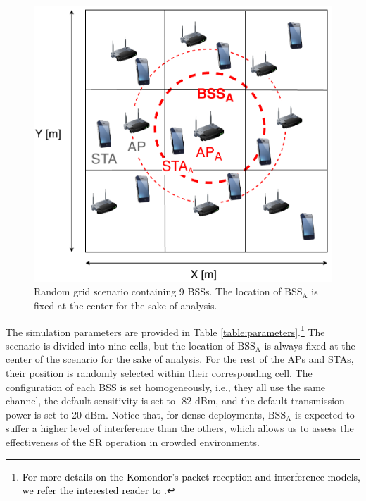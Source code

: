 \documentclass[preprint,12pt]{elsarticle}
\begin{document}
\begin{figure}[ht!]
	\centering
	\includegraphics[width=0.45\columnwidth]{random_scenario}
	\caption{Random grid scenario containing 9 BSSs. The location of $\text{BSS}_\text{A}$ is fixed at the center for the sake of analysis.}
	\label{fig:random_scenario}
\end{figure}

The simulation parameters are provided in Table \ref{table:parameters}.\footnote{\textcolor{black}{For more details on the Komondor's packet reception and interference models, we refer the interested reader to \cite{barrachina2019komondor}.}} The scenario is divided into nine cells, but the location of $\text{BSS}_\text{A}$ is always fixed at the center of the scenario for the sake of analysis. For the rest of the APs and STAs, their position is randomly selected within their corresponding cell. The configuration of each BSS is set homogeneously, i.e., they all use the same channel, the default sensitivity is set to -82 dBm, and the default transmission power is set to 20 dBm. Notice that, for dense deployments, $\text{BSS}_\text{A}$ is expected to suffer a higher level of interference than the others, which allows us to assess the effectiveness of the SR operation in crowded environments.
\end{document}
